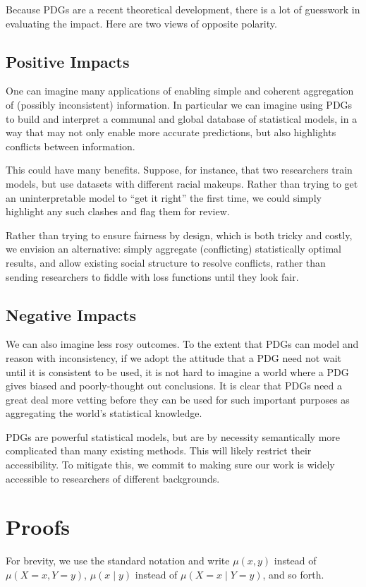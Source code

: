 \documentclass[letterpaper]{article} %
\theoremstyle{plain}
\theoremstyle{definition}
\theoremstyle{remark}
\newif\ifappendix
\begin{document}
Because PDGs are a recent theoretical development, there is a lot of
guesswork in evaluating the impact. Here are two views of opposite polarity.

\subsection*{Positive Impacts}
One can imagine many applications of enabling simple and coherent
aggregation of (possibly inconsistent) information. In particular we
can imagine using PDGs to build and interpret a communal and global
database of statistical models, in a way that may not only enable more
accurate predictions, but also highlights conflicts between
information.

This could have many benefits. Suppose, for instance, that two researchers train
models, but use datasets with different racial makeups. Rather than trying to
get an uninterpretable model to ``get it right'' the first time, we could simply
highlight any
such clashes and flag them for review.

Rather than trying to ensure fairness by design, which is both tricky and
costly, we envision an alternative: simply aggregate (conflicting) statistically
optimal results, and allow existing social structure to resolve conflicts,
rather than sending researchers to fiddle with loss functions until they look fair. 


\subsection*{Negative Impacts}
We can also imagine less rosy outcomes. To the extent that PDGs can
model and reason with inconsistency, if we adopt the attitude that a PDG need
not wait until it is consistent to be used, it is not hard to imagine a world
where a PDG gives biased and
poorly-thought out conclusions. It is clear that PDGs need a great deal more
vetting before they can be used for such important purposes as
aggregating the world's statistical knowledge.

PDGs are powerful statistical models, but are by necessity semantically more
complicated than many existing methods. This will likely restrict their
accessibility. To mitigate this, we commit to making sure our work is widely
accessible to researchers of different
backgrounds.
\fi
\ifappendix
\appendix
\clearpage
\onecolumn
\section{Proofs} \label{sec:proofs}
		For brevity, we use the standard notation and write $\mu(x, y)$
	instead of $\mu(X \!=\! x, Y \!=\! y)$, $\mu(x \mid y)$ instead of
	$\mu(X \!=\! x\mid Y \!=\! y)$, and so forth.
\end{document}
